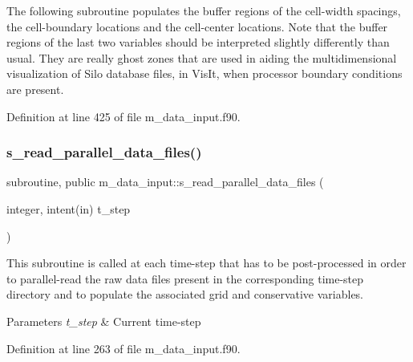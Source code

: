 The following subroutine populates the buffer regions of the cell-\/width spacings, the cell-\/boundary locations and the cell-\/center locations. Note that the buffer regions of the last two variables should be interpreted slightly differently than usual. They are really ghost zones that are used in aiding the multidimensional visualization of Silo database files, in Vis\+It, when processor boundary conditions are present. 



Definition at line 425 of file m\+\_\+data\+\_\+input.\+f90.

\mbox{\label{namespacem__data__input_a0dd37369dd52b1299b06563f96c25805}} 
\subsubsection{\texorpdfstring{s\+\_\+read\+\_\+parallel\+\_\+data\+\_\+files()}{s\_read\_parallel\_data\_files()}}
{\footnotesize\ttfamily subroutine, public m\+\_\+data\+\_\+input\+::s\+\_\+read\+\_\+parallel\+\_\+data\+\_\+files (\begin{DoxyParamCaption}\item[{integer, intent(in)}]{t\+\_\+step }\end{DoxyParamCaption})}



This subroutine is called at each time-\/step that has to be post-\/processed in order to parallel-\/read the raw data files present in the corresponding time-\/step directory and to populate the associated grid and conservative variables. 


\begin{DoxyParams}{Parameters}
{\em t\+\_\+step} & Current time-\/step \\
\hline
\end{DoxyParams}


Definition at line 263 of file m\+\_\+data\+\_\+input.\+f90.

\mbox{\label{namespacem__data__input_a9d69f4bcb771c60157b62bc4b04a6ba1}} 
